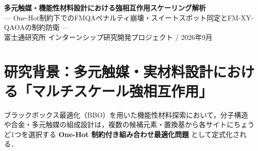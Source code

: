 \documentclass[11pt,a4paper]{ltjsarticle}
\begin{document}
\begin{center}
\vspace*{-4mm}
{\LARGE\textbf{多元触媒・機能性材料設計における強相互作用スケーリング解析}}\\[1.5mm]
{\large--- One-Hot制約下でのFMQAペナルティ崩壊・スイートスポット同定とFM-XY-QAOAの制約防衛 ---}\\[1.5mm]
{\normalsize 富士通研究所 インターンシップ研究開発プロジェクト \quad / \quad 2026年9月}
\vspace{-1mm}
\end{center}

\begin{abstract}
\noindent
高分子配合や多元触媒探索などの実材料設計におけるブラックボックス最適化（BBO）では，特定吸着サイト間の協同触媒効果に起因する「マルチスケールな強相互作用」が普遍的に現れる．本稿では，先行研究FMQA（Factorization Machine with Quantum Annealing / SA）と提案手法FM-XY-QAOA（ゲート型量子部分空間探索）を対象とし，強相互作用下における変数スケーリング（$N=16 \sim 32$，$M=4 \sim 8$ サイト，全空間最大 42.9 億通り）のベンチマーク実験（複数インスタンス検証）を実施した．その結果，\textbf{(1) 標準固定ペナルティ（$\lambda=5.0$）を用いたFMQAは強相関結合にペナルティが完敗し，全スケール（$N=16 \sim 32$）で制約充足率がほぼ $0.0\%$ へ急落する「ペナルティ崩壊現象（Penalty Collapse）」を起こすこと}，\textbf{(2) 理論式に基づきペナルティ係数を適切に自動設計した適応型FMQA（$\lambda_{\mathrm{adaptive}}$）およびスイープ解析により，制約充足と探索性能を両立する「スイートスポット（$\lambda \in [10, 15]$）」が存在する一方，過剰ペナルティ（$\lambda \ge 20$）では局所解トラップにより最適解到達率が急落する「ペナルティジレンマ」を実証したこと}，\textbf{(3) 対して FM-XY-QAOA は粒子数保存対称性 $[H_{\mathrm{XY}}, \hat{N}]=0$ によりチューニング不要で全スケール制約充足率 100.0\% を数学的に永久保証し，古典局所探索を融合した Hybrid QAOA により，42.9 億通りの巨大空間（$N=32$）においても厳密大域最小解への到達率 60\%，残差ギャップ $+0.701$（$p=1$ 比 85.4\% 削減）の極めて高い最適化性能を達成すること}，を定量的に実証した．
\end{abstract}

\vspace{-1mm}

\section{研究背景：多元触媒・実材料設計における「マルチスケール強相互作用」}
\label{sec:intro}
ブラックボックス最適化（BBO）を用いた機能性材料探索において，分子構造や合金・多元触媒の組成設計は，複数の候補元素・置換基から各サイトにちょうど1つを選択する \textbf{One-Hot 制約付き組み合わせ最適化問題} として定式化される．
\end{document}
